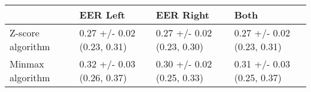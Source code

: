 \begin{tabular}{llll}
\toprule
{} &                    EER Left &                   EER Right &                        Both \\
\midrule
Z-score algorithm &  0.27 +/- 0.02 (0.23, 0.31) &  0.27 +/- 0.02 (0.23, 0.30) &  0.27 +/- 0.02 (0.23, 0.31) \\
Minmax algorithm  &  0.32 +/- 0.03 (0.26, 0.37) &  0.30 +/- 0.02 (0.25, 0.33) &  0.31 +/- 0.03 (0.25, 0.37) \\
\bottomrule
\end{tabular}
